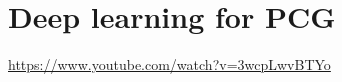 \part{Deep learning for PCG}
\frame{\partpage}

\begin{frame}
	\begin{center}
		\url{https://www.youtube.com/watch?v=3wcpLwvBTYo}
	\end{center}
\end{frame}
